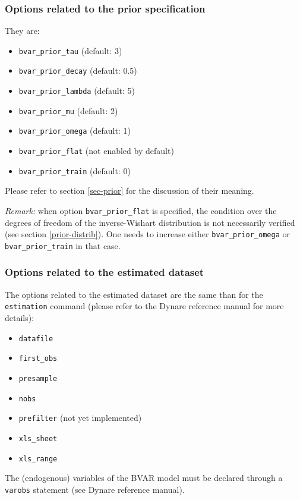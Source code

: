 \documentclass[10pt,a4paper]{article}
\begin{document}
\subsubsection{Options related to the prior specification}

They are:
\begin{itemize}
\item \texttt{bvar\_prior\_tau} (default: 3)
\item \texttt{bvar\_prior\_decay} (default: 0.5)
\item \texttt{bvar\_prior\_lambda} (default: 5)
\item \texttt{bvar\_prior\_mu} (default: 2)
\item \texttt{bvar\_prior\_omega} (default: 1)
\item \texttt{bvar\_prior\_flat} (not enabled by default)
\item \texttt{bvar\_prior\_train} (default: 0)
\end{itemize}
Please refer to section \ref{sec-prior} for the discussion of their meaning.


\emph{Remark:} when option \texttt{bvar\_prior\_flat} is specified, the condition over the degrees of freedom of the inverse-Wishart distribution is not necessarily verified (see section \ref{prior-distrib}). One needs to increase either \texttt{bvar\_prior\_omega} or \texttt{bvar\_prior\_train} in that case.

\subsubsection{Options related to the estimated dataset}

The options related to the estimated dataset are the same than for the \texttt{estimation} command (please refer to the Dynare reference manual for more details):
\begin{itemize}
\item \texttt{datafile}
\item \texttt{first\_obs}
\item \texttt{presample}
\item \texttt{nobs}
\item \texttt{prefilter} (not yet implemented)
\item \texttt{xls\_sheet}
\item \texttt{xls\_range}
\end{itemize}

The (endogenous) variables of the BVAR model must be declared through a \texttt{varobs} statement (see Dynare reference manual).
\end{document}
